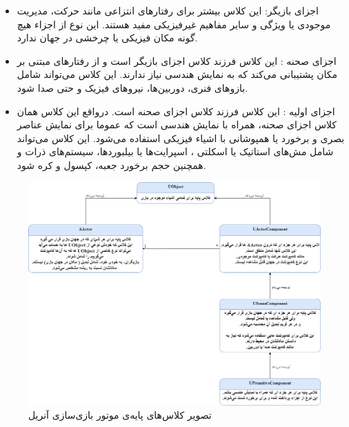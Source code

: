 \begin{itemize}
	\item اجزای بازیگر: این کلاس بیشتر برای رفتارهای انتزاعی مانند حرکت، مدیریت موجودی یا ویژگی و سایر مفاهیم غیرفیزیکی مفید هستند. این نوع از اجزاء هیچ گونه مکان فیزیکی یا چرخشی در جهان ندارد.
	\item اجزای صحنه : این کلاس فرزند کلاس اجزای بازیگر است و از رفتار‌های مبتنی بر مکان پشتیبانی می‌کند که به نمایش هندسی نیاز ندارند. این کلاس می‌تواند شامل بازوهای فنری، دوربین‌ها، نیروهای فیزیک و حتی صدا شود.
	\item اجزای اولیه : این کلاس فرزند کلاس اجزای صحنه است. درواقع این کلاس همان کلاس اجزای صحنه، همراه با نمایش هندسی است که عموما برای نمایش عناصر بصری و برخورد
	یا همپوشانی
	با اشیاء فیزیکی استفاده می‌شود. این کلاس می‌تواند شامل مش‌های استاتیک
	یا اسکلتی
	، اسپرایت‌ها یا بیلبورد‌ها، سیستم‌های ذرات
	و همچنین حجم برخورد
	جعبه، کپسول و کره شود.
\end{itemize}

\cite{UnrealEngineComponents}

\begin{figure}[ht]
	\centerline{\includegraphics[width=\textwidth,height=\textheight,keepaspectratio]{Figures/Ch2/UnrealEngineBasicClassesUML.png}}

	\caption{تصویر  کلاس‌های پایه‌ی موتور‌ بازی‌سازی آنریل}
	\label{fig:UnrealEngineBasicClassesUML}
  \end{figure}
  